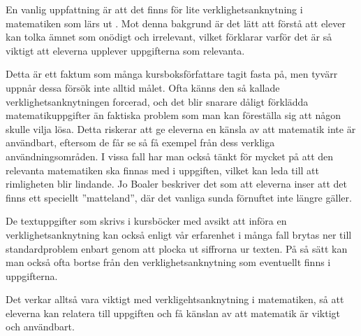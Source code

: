 \textcolor{lila}{En vanlig uppfattning är att det finns för lite verklighetsanknytning i matematiken som lärs ut \cite{TheElephant}. Mot denna bakgrund är det lätt att förstå att elever kan tolka ämnet som onödigt och irrelevant, vilket förklarar varför det är så viktigt att eleverna upplever uppgifterna som relevanta.}

\textcolor{lila}{Detta är ett faktum som många kursboksförfattare tagit fasta på, men tyvärr uppnår dessa försök inte alltid målet. Ofta känns den så kallade verklighetsanknytningen forcerad, och det blir snarare dåligt förklädda matematikuppgifter än faktiska problem som man kan föreställa sig att någon skulle vilja lösa. Detta riskerar att ge eleverna en känsla av att matematik inte är användbart, eftersom de får se så få exempel från dess verkliga användningsområden.
I vissa fall har man också tänkt för mycket på att den relevanta matematiken ska finnas med i uppgiften, vilket kan leda till att rimligheten blir lindande. Jo Boaler beskriver det som att eleverna inser att det finns ett speciellt ''matteland'', där det vanliga sunda förnuftet inte längre gäller. \cite{TheElephant}}
    
\textcolor{lila}{De textuppgifter som skrivs  i kursböcker med avsikt att införa en verklighetsanknytning kan också enligt vår erfarenhet i många fall brytas ner till standardproblem enbart genom att plocka ut siffrorna ur texten. På så sätt kan man också ofta bortse från den verklighetsanknytning som eventuellt finns i uppgifterna.}

\textcolor{lila}{Det verkar alltså vara viktigt med verkligehtsanknytning i matematiken, så att eleverna kan relatera till uppgiften och få känslan av att matematik är viktigt och användbart.}